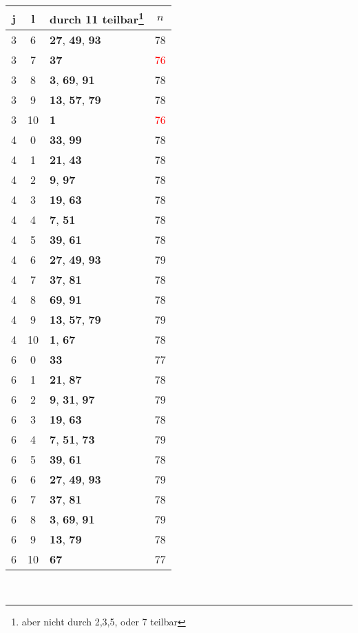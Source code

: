 \documentclass{article}
\begin{document}
\begin{minipage}[t]{0.5\textwidth}
\vspace{0pt}
\begin{tabular}{||c|c|l|c||}
	j&l&durch 11 teilbar\footnote{aber nicht durch 2,3,5, oder 7 teilbar}&$n$\\
	\hline
	3&6&\textbf{27}, \textbf{49}, \textbf{93}&78\\
	3&7&\textbf{37}&\textcolor{red}{76}\\
	3&8&\textbf{3}, \textbf{69}, \textbf{91}&78\\
	3&9&\textbf{13}, \textbf{57}, \textbf{79}&78\\
	3&10&\textbf{1}&\textcolor{red}{76}\\
	4&0&\textbf{33}, \textbf{99}&78\\
	4&1&\textbf{21}, \textbf{43}&78\\
	4&2&\textbf{9}, \textbf{97}&78\\
	4&3&\textbf{19}, \textbf{63}&78\\
	4&4&\textbf{7}, \textbf{51}&78\\
	4&5&\textbf{39}, \textbf{61}&78\\
	4&6&\textbf{27}, \textbf{49}, \textbf{93}&79\\
	4&7&\textbf{37}, \textbf{81}&78\\
	4&8&\textbf{69}, \textbf{91}&78\\
	4&9&\textbf{13}, \textbf{57}, \textbf{79}&79\\
	4&10&\textbf{1}, \textbf{67}&78\\
	6&0&\textbf{33}&77\\
	6&1&\textbf{21}, \textbf{87}&78\\
	6&2&\textbf{9}, \textbf{31}, \textbf{97}&79\\
	6&3&\textbf{19}, \textbf{63}&78\\
	6&4&\textbf{7}, \textbf{51}, \textbf{73}&79\\
	6&5&\textbf{39}, \textbf{61}&78\\
	6&6&\textbf{27}, \textbf{49}, \textbf{93}&79\\
	6&7&\textbf{37}, \textbf{81}&78\\
	6&8&\textbf{3}, \textbf{69}, \textbf{91}&79\\
	6&9&\textbf{13}, \textbf{79}&78\\
	6&10&\textbf{67}&77\\
\end{tabular}
\end{minipage}
\ \newline
\end{document}
